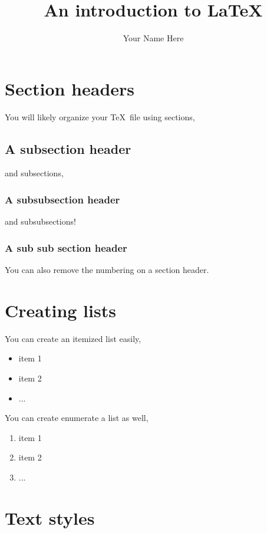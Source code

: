 \documentclass[11pt, oneside]{article}
\title{An introduction to \LaTeX} %
\author{Your Name Here}
\begin{document}
	\maketitle

\section{Section headers}

You will likely organize your \TeX \ file using sections, 

\subsection{A subsection header}

and subsections, 

\subsubsection{A subsubsection header}

and subsubsections! 

\subsubsection*{A sub sub section header}

You can also remove the numbering on a section header.

\section{Creating lists} 

You can create an itemized list easily, 
\begin{itemize}
	\item item 1
	\item item 2 
	\item ... 
\end{itemize}

\noindent You can create enumerate a list as well, 
\begin{enumerate}
	\item item 1
	\item item 2 
	\item ... 
\end{enumerate}

\section{Text styles} 
\end{document}

